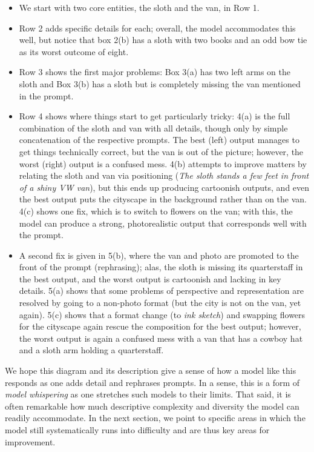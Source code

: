 \begin{itemize}
    \item We start with two core entities, the sloth and the van, in Row 1. 
    \item Row 2 adds specific details for each; overall, the model accommodates this well, but notice that box 2(b) has a sloth with two books and an odd bow tie as its worst outcome of eight.
    \item Row 3 shows the first major problems: Box 3(a) has two left arms on the sloth and Box 3(b) has a sloth but is completely missing the van mentioned in the prompt.
    \item Row 4 shows where things start to get particularly tricky: 4(a) is the full combination of the sloth and van with all details, though only by simple concatenation of the respective prompts. The best (left) output manages to get things technically correct, but the van is out of the picture; however, the worst (right) output is a confused mess. 4(b) attempts to improve matters by relating the sloth and van via positioning (\textit{The sloth stands a few feet in front of a shiny VW van}), but this ends up producing cartoonish outputs, and even the best output puts the cityscape in the background rather than on the van. 4(c) shows one fix, which is to switch to flowers on the van; with this, the model can produce a strong, photorealistic output that corresponds well with the prompt.
    \item A second fix is given in 5(b), where the van and photo are promoted to the front of the prompt (rephrasing); alas, the sloth is missing its quarterstaff in the best output, and the worst output is cartoonish and lacking in key details. 5(a) shows that some problems of perspective and representation are resolved by going to a non-photo format (but the city is not on the van, yet again). 5(c) shows that a format change (to \textit{ink sketch}) and swapping flowers for the cityscape again rescue the composition for the best output; however, the worst output is again a confused mess with a van that has a cowboy hat and a sloth arm holding a quarterstaff. 
\end{itemize}

We hope this diagram and its description give a sense of how a model like this responds as one adds detail and rephrases prompts. In a sense, this is a form of \textit{model whispering} as one stretches such models to their limits. That said, it is often remarkable how much descriptive complexity and diversity the model can readily accommodate. In the next section, we point to specific areas in which the \bdraw model still systematically runs into difficulty and are thus key areas for improvement.

